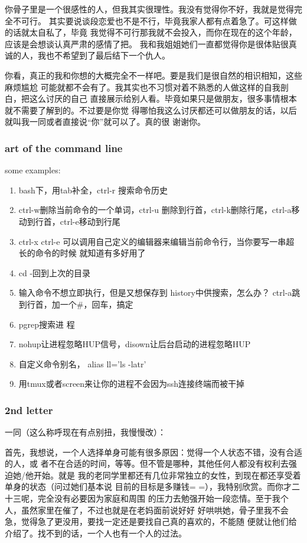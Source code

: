 \documentclass[11pt]{article}
\begin{document}
你骨子里是一个很感性的人，但我其实很理性。我没有觉得你不好，我就是觉得完全不可行。
其实要说谈段恋爱也不是不行，毕竟我家人都有点着急了。可这样做的话就太自私了，毕竟
我觉得不可行那我就不会投入，而你在现在的这个年龄，应该是会想谈认真严肃的感情了把。
我和我姐姐她们一直都觉得你是很体贴很真诚的人，我也不希望到了最后结下一个仇人。

你看，真正的我和你想的大概完全不一样吧。要是我们是很自然的相识相知，这些麻烦尴尬
可能就都不会有了。我其实也不习惯对着不熟悉的人做这样的自我剖白，把这么讨厌的自己
直接展示给别人看。毕竟如果只是做朋友，很多事情根本就不需要了解到的。不过要是你觉
得哪怕我这么讨厌都还可以做朋友的话，以后就叫我一同或者直接说“你”就可以了。真的很
谢谢你。

\subsubsection*{art of the command line}
\label{sec:orgheadline34}
some examples:

\begin{enumerate}
\item bash下，用tab补全，ctrl-r 搜索命令历史
\item ctrl-w删除当前命令的一个单词，ctrl-u
删除到行首，ctrl-k删除行尾，ctrl-a移动到行首，ctrl-e移动到行尾
\item ctrl-x
ctrl-e 可以调用自己定义的编辑器来编辑当前命令行，当你要写一串超长的命令的时候
就知道有多好用了
\item cd -回到上次的目录
\item 输入命令不想立即执行，但是又想保存到
history中供搜索，怎么办？ ctrl-a跳到行首，加一个\#，回车，搞定
\item pgrep搜索进
程
\item nohup让进程忽略HUP信号，disown让后台启动的进程忽略HUP
\item 自定义命令别名，
alias ll='ls -latr'
\item 用tmux或者screen来让你的进程不会因为ssh连接终端而被干掉
\end{enumerate}

\subsubsection*{2nd letter}
\label{sec:orgheadline35}
一同（这么称呼现在有点别扭，我慢慢改）：

首先，我想说，一个人选择单身可能有很多原因：觉得一个人状态不错，没有合适的人，或
者不在合适的时间，等等。但不管是哪种，其他任何人都没有权利去强迫她/他开始。就是
我的老同学里都还有几位非常独立的女性，到现在都还享受着单身的状态（问过她们基本说
目前的目标是多赚钱= =），我特别欣赏。而你才二十三呢，完全没有必要因为家庭和周围
的压力去勉强开始一段恋情。至于我个人，虽然家里在催了，不过也就是在老妈面前说好好
好哄哄她，骨子里我不会急，觉得急了更没用，要找一定还是要找自己真的喜欢的，不能随
便就让他们给介绍了。找不到的话，一个人也有一个人的过法。
\end{document}

